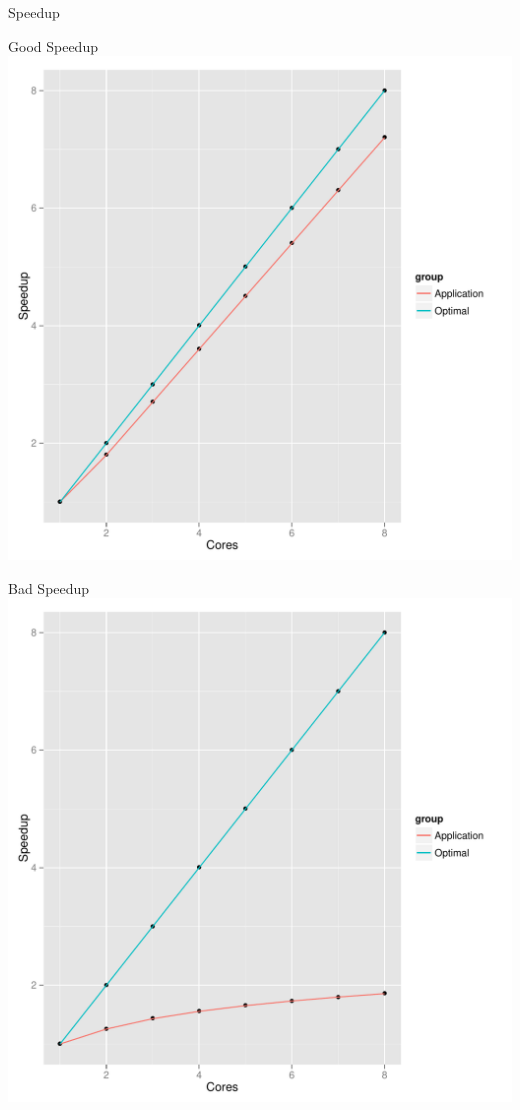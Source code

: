 \begin{frame}
  \begin{block}{Speedup}
   \begin{center}
    \begin{minipage}{.475\textwidth}
    \begin{block}{Good Speedup}
      \centering
      \includegraphics[width=.95\textwidth]{../common/pics/scale_good}
    \end{block}
    \end{minipage}
    \hspace{.1cm}
    \begin{minipage}{.475\textwidth}
    \begin{block}{Bad Speedup}
      \centering
      \includegraphics[width=.95\textwidth]{../common/pics/scale_bad}

\end{block}
\end{minipage}
\end{center}
\end{block}
\end{frame}

